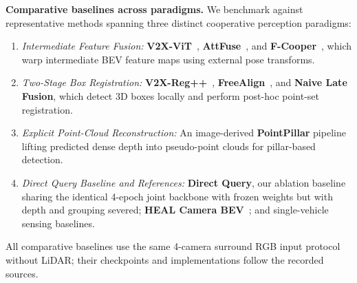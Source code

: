 \textbf{Comparative baselines across paradigms.} We benchmark against representative methods spanning three distinct cooperative perception paradigms:
\begin{enumerate}
    \item \emph{Intermediate Feature Fusion:} \textbf{V2X-ViT}~\cite{v2xvit}, \textbf{AttFuse}~\cite{opv2v}, and \textbf{F-Cooper}~\cite{fcooper}, which warp intermediate BEV feature maps using external pose transforms.
    \item \emph{Two-Stage Box Registration:} \textbf{V2X-Reg++}~\cite{v2xreg}, \textbf{FreeAlign}~\cite{freealign}, and \textbf{Naive Late Fusion}, which detect 3D boxes locally and perform post-hoc point-set registration.
    \item \emph{Explicit Point-Cloud Reconstruction:} An image-derived \textbf{PointPillar} pipeline~\cite{pointpillars} lifting predicted dense depth into pseudo-point clouds for pillar-based detection.
    \item \emph{Direct Query Baseline and References:} \textbf{Direct Query}, our ablation baseline sharing the identical 4-epoch joint backbone with frozen weights but with depth and grouping severed; \textbf{HEAL Camera BEV}~\cite{heal}; and single-vehicle sensing baselines.
\end{enumerate}
All comparative baselines use the same 4-camera surround RGB input protocol without LiDAR; their checkpoints and implementations follow the recorded sources.

